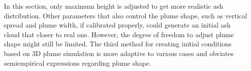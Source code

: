In this section, only maximum height is adjusted to get more realistic ash distribution. Other parameters that also control the plume shape, such as vertical spread and plume width, if calibrated properly, could generate an initial ash cloud that closer to real one. However, the degree of freedom to adjust plume shape might still be limited. The third method for creating initial conditions based on 3D plume simulation is more adaptive to various cases and obviates semiempirical expressions regarding plume shape.

%
